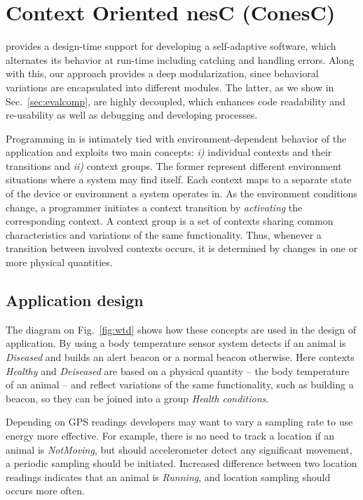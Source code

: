 
\section{Context Oriented nesC (ConesC)}

\conesc provides a design-time support for developing a self-adaptive software,
which alternates its behavior at run-time including catching and handling
errors. Along with this, our approach provides a deep modularization, since
behavioral variations are encapsulated into different modules. The latter, as we
show in Sec.~\ref{sec:evalcomp}, are highly decoupled, which enhances code
readability and re-usability as well as debugging and developing processes.

Programming in \conesc is intimately tied with environment-dependent behavior of
the application and exploits two main concepts: \emph{i)} individual contexts
and their transitions and \emph{ii)} context groups. The former represent
different environment situations where a system may find itself. Each context
maps to a separate state of the device or environment a system operates in. As
the environment conditions change, a programmer initiates a context transition
by \emph{activating} the corresponding context. A context group is a set of
contexts sharing common characteristics and variations of the same
functionality. Thus, whenever a transition between involved contexts occurs, it
is determined by changes in one or more physical quantities.

\subsection{Application design}\label{sec:appdesign}

The diagram on Fig.~\ref{fig:wtd} shows how these concepts are used in the
design of application. By using a body temperature sensor system detects if an
animal is \emph{Diseased} and builds an alert beacon or a normal beacon
otherwise. Here contexts \emph{Healthy} and \emph{Deiseased} are based on a
physical quantity -- the body temperature of an animal -- and reflect variations
of the same functionality, such as building a beacon, so they can be joined into
a group \emph{Health conditions}.

Depending on GPS readings developers may want to vary a sampling rate to use
energy more effective. For example, there is no need to track a location if an
animal is \emph{NotMoving}, but should accelerometer detect any significant
movement, a periodic sampling should be initiated. Increased difference between
two location readings indicates that an animal is \emph{Running}, and location
sampling should occurs more often.

